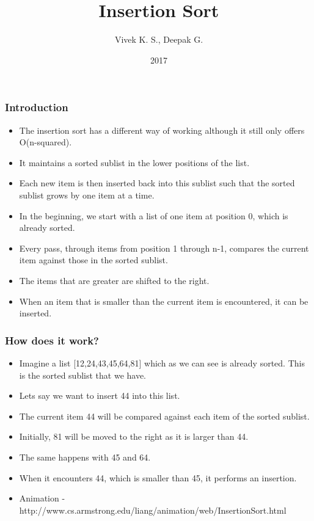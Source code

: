 \documentclass{beamer}
\title{Insertion Sort}
\author{Vivek K. S., Deepak G.}
\institute{Information Systems Decision Sciences (ISDS)\\
MUMA College of Business\\
University of South Florida \\
Tampa, Florida}
\date{2017}
\begin{document}
\frame{\titlepage}
\begin{frame}
\frametitle{Introduction}
\begin{itemize}
\item The insertion sort has  a different way of working although it still only offers O(n-squared).
\item It maintains a sorted sublist in the lower positions of the list.
\item Each new item is then inserted back into this sublist such that the sorted sublist grows by one item at a time.
\item In the beginning, we start with a list of one item at position 0, which is already sorted.
\item Every pass, through items from position 1 through n-1, compares the current item against those in the sorted sublist.
\item The items that are greater are shifted to the right.
\item When an item that is smaller than the current item is encountered, it can be inserted.
\end{itemize}
\end{frame}


\begin{frame}
\frametitle{How does it work?}
\begin{itemize}
\item Imagine a list [12,24,43,45,64,81] which as we can see is already sorted. This  is the sorted sublist that we have.
\item Lets say we want to insert 44 into this list.
\item The current item 44 will be compared against each item of the sorted sublist.
\item Initially, 81 will be moved to the right as it is larger than 44. 
\item The same happens with 45 and 64.
\item When it encounters 44, which is smaller than 45, it performs an insertion.
\item Animation - http://www.cs.armstrong.edu/liang/animation/web/InsertionSort.html
\end{itemize}
\end{frame}
\end{document}
